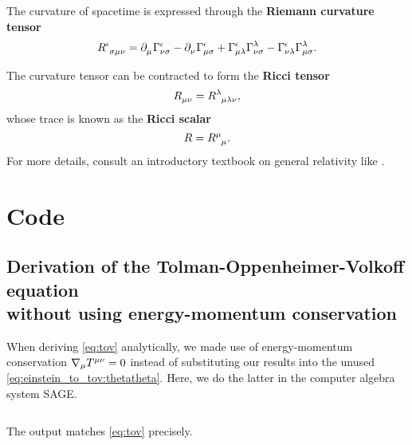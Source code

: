 \documentclass[a4paper,11pt,twoside]{report}
\begin{document}
The curvature of spacetime is expressed through the \textbf{Riemann curvature tensor}
\begin{equation}
	R\indices{^\epsilon_\sigma_\mu_\nu} =
	\partial\indices{_\mu} \Gamma^\epsilon_{\nu \sigma} -
	\partial\indices{_\nu} \Gamma^{\epsilon}_{\mu \sigma} +
	\Gamma^\epsilon_{\mu \lambda} \Gamma^{\lambda}_{\nu \sigma} -
	\Gamma^\epsilon_{\nu \lambda} \Gamma^{\lambda}_{\mu \sigma} .
	\label{eq:def_riemann_tensor}
\end{equation}

The curvature tensor can be contracted to form the \textbf{Ricci tensor}
\begin{equation}
	R\indices{_\mu_\nu} = R\indices{^\lambda_\mu_\lambda_\nu},
	\label{eq:def_ricci_tensor}
\end{equation}
whose trace is known as the \textbf{Ricci scalar}
\begin{equation}
	R = R\indices{^\mu_\mu} .
	\label{eq:def_ricci_scalar}
\end{equation}
For more details, consult an introductory textbook on general relativity like \cite{ref:carroll}.

\chapter{Code}

\section{Derivation of the Tolman-Oppenheimer-Volkoff equation \texorpdfstring{\\}{} without using energy-momentum conservation}
\label{sec:tov_cas_derivation}

When deriving \cref{eq:tov} analytically, we made use of energy-momentum conservation $\nabla_\mu T\indices{^\mu^\nu} = 0$ instead of substituting our results into the unused \cref{eq:einstein_to_tov:thetatheta}.
Here, we do the latter in the computer algebra system SAGE.

\inputminted{python}{../code/einstein_to_tov/ein.sage}

The output matches \cref{eq:tov} precisely.

\printbibliography
\end{document}
